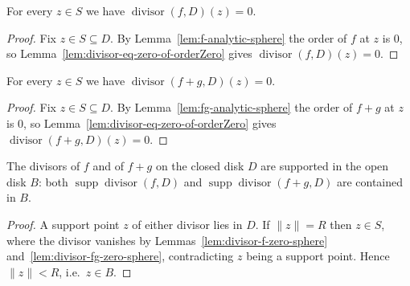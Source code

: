 \begin{lemma}
    \label{lem:divisor-f-zero-sphere}
    \leanok
    For every $z \in S$ we have $\operatorname{divisor}(f,D)(z) = 0$.
\end{lemma}
\begin{proof}
    Fix $z \in S \subseteq D$. By Lemma~\ref{lem:f-analytic-sphere} the order of
    $f$ at $z$ is $0$, so Lemma~\ref{lem:divisor-eq-zero-of-orderZero} gives
    $\operatorname{divisor}(f,D)(z) = 0$.
\end{proof}

\begin{lemma}
    \label{lem:divisor-fg-zero-sphere}
    \leanok
    For every $z \in S$ we have $\operatorname{divisor}(f+g,D)(z) = 0$.
\end{lemma}
\begin{proof}
    Fix $z \in S \subseteq D$. By Lemma~\ref{lem:fg-analytic-sphere} the order of
    $f+g$ at $z$ is $0$, so Lemma~\ref{lem:divisor-eq-zero-of-orderZero} gives
    $\operatorname{divisor}(f+g,D)(z) = 0$.
\end{proof}

\begin{lemma}
    \label{lem:divisor-support-open}
    \leanok
    The divisors of $f$ and of $f+g$ on the closed disk $D$ are supported in the
    open disk $B$: both $\operatorname{supp}\operatorname{divisor}(f,D)$ and
    $\operatorname{supp}\operatorname{divisor}(f+g,D)$ are contained in $B$.
\end{lemma}
\begin{proof}
    A support point $z$ of either divisor lies in $D$. If $\|z\| = R$ then
    $z \in S$, where the divisor vanishes by
    Lemmas~\ref{lem:divisor-f-zero-sphere} and~\ref{lem:divisor-fg-zero-sphere},
    contradicting $z$ being a support point. Hence $\|z\| < R$, i.e.\ $z \in B$.
\end{proof}

